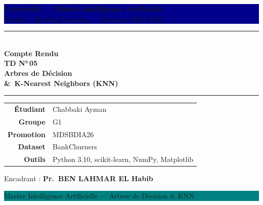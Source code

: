\documentclass[12pt,a4paper]{article}
\begin{document}
\begin{titlepage}
  \thispagestyle{empty}

  \noindent
  \colorbox{darkblue}{\parbox{\linewidth}{%
    \vspace{8pt}
    \centering
    \color{white}\large\textbf{Université — Master Intelligence Artificielle}\\[4pt]
    \color{white}\normalsize Module : Machine Learning — Semestre 2024–2025
    \vspace{8pt}
  }}

  \vspace{2.5cm}

  \begin{center}
    {\color{darkblue}\rule{0.85\linewidth}{1.5pt}}\\[18pt]
    {\Huge\bfseries\color{darkblue} Compte Rendu}\\[10pt]
    {\huge\bfseries\color{teal} TD N°\,05}\\[14pt]
    {\LARGE\bfseries Arbres de Décision}\\[6pt]
    {\LARGE\bfseries\color{crimson} \&\ K-Nearest Neighbors (KNN)}\\[18pt]
    {\color{darkblue}\rule{0.85\linewidth}{1.5pt}}
  \end{center}

  \vspace{2.5cm}

  \begin{center}
    \begin{tabular}{rl}
      \toprule
      \textbf{Étudiant}     & Chabbaki Ayman \\[4pt]
      \textbf{Groupe}       & G1 \\[4pt]
      \textbf{Promotion}    & MDSBDIA26 \\[4pt]
      \textbf{Dataset}      & BankChurners \\[4pt]
      \textbf{Outils}       & Python 3.10, scikit-learn, NumPy, Matplotlib \\[4pt]
      \bottomrule
    \end{tabular}
  \end{center}

  \vspace{2cm}

  \begin{center}
    {\large Encadrant : \textbf{Pr.\ BEN LAHMAR EL Habib}}
  \end{center}

  \vfill

  \noindent
  \colorbox{teal}{\parbox{\linewidth}{%
    \vspace{6pt}
    \centering
    \color{white}\small
    Master Intelligence Artificielle — Arbres de Décision \& KNN
    \vspace{6pt}
  }}
\end{titlepage}
\end{document}
